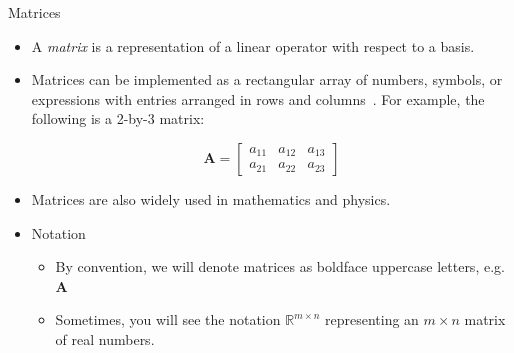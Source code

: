\documentclass[aspectratio=169,xcolor=dvipsnames]{beamer}
\begin{document}
\begin{frame}{Matrices}

\begin{itemize}
      \item A \textit{matrix} is a representation of a linear operator with respect to a basis.
      \item Matrices can be implemented as a rectangular array of numbers, symbols, or expressions
      with entries arranged in rows and columns~\cite{Wikipedia_Matrix_2025}. For
      example, the following is a 2-by-3 matrix: 
      
      $$\mathbf{A} = 
      \begin{bmatrix}
        a_{11} & a_{12} & a_{13} \\
        a_{21} & a_{22} & a_{23}
      \end{bmatrix}$$
      \item Matrices are also widely used in mathematics and physics.
      \item Notation
            \begin{itemize}
                  \item By convention, we will denote matrices as boldface
                        uppercase letters, e.g. $\mathbf{A}$
                  \item Sometimes, you will see the notation $\mathbb{R}^{m\times n}$
                        representing an $m \times n$ matrix of real numbers.
            \end{itemize}
\end{itemize}

\end{frame}

\end{document}
